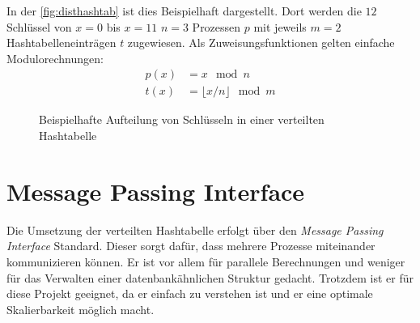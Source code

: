 \documentclass{scrreprt}
\begin{document}
In der \autoref{fig:disthashtab} ist dies Beispielhaft dargestellt. Dort werden die $12$ Schlüssel von $x=0$ bis $x=11$ $n=3$ Prozessen $p$ mit jeweils $m=2$ Hashtabelleneinträgen $t$ zugewiesen. Als Zuweisungsfunktionen gelten einfache Modulorechnungen:
\begin{align*}
p(x)&=x\mod n\\
t(x)&=\lfloor x/n\rfloor\mod m
\end{align*}
\begin{figure}[!ht]
\centering
{}
\caption{Beispielhafte Aufteilung von Schlüsseln in einer verteilten Hashtabelle}
\label{fig:disthashtab}
\end{figure}

\section{Message Passing Interface}
Die Umsetzung der verteilten Hashtabelle erfolgt über den \emph{Message Passing Interface} Standard. Dieser sorgt dafür, dass mehrere Prozesse miteinander kommunizieren können. Er ist vor allem für parallele Berechnungen und weniger für das Verwalten einer datenbankähnlichen Struktur gedacht. Trotzdem ist er für diese Projekt geeignet, da er einfach zu verstehen ist und er eine optimale Skalierbarkeit möglich macht.
\end{document}
